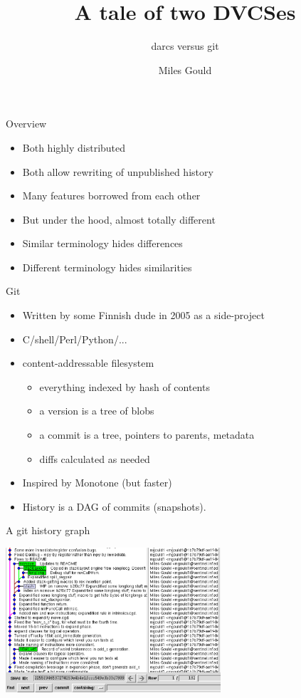 \documentclass[pdf]{prosper}
\title{A tale of two DVCSes}
\subtitle{darcs versus git}
\author{Miles Gould}
\begin{document}
\maketitle


\begin{slide}{Overview}
\begin{itemize}
\item Both highly distributed
\item Both allow rewriting of unpublished history
\item Many features borrowed from each other
\item But under the hood, almost totally different
\item Similar terminology hides differences
\item Different terminology hides similarities
\end{itemize}
\end{slide}

\begin{slide}{Git}
\begin{itemize}
\item Written by some Finnish dude in 2005 as a side-project
\item C/shell/Perl/Python/...
\item content-addressable filesystem
\begin{itemize}
	\item everything indexed by hash of contents
	\item a version is a tree of blobs
	\item a commit is a tree, pointers to parents, metadata
	\item diffs calculated as needed
\end{itemize}
\item Inspired by Monotone (but faster)
\item History is a DAG of commits (snapshots).
\end{itemize}
\end{slide}

\begin{slide}{A git history graph}
\begin{center}
\includegraphics[width=8cm]{gitrepo_small.eps}
\end{center}
\end{slide}
\end{document}
